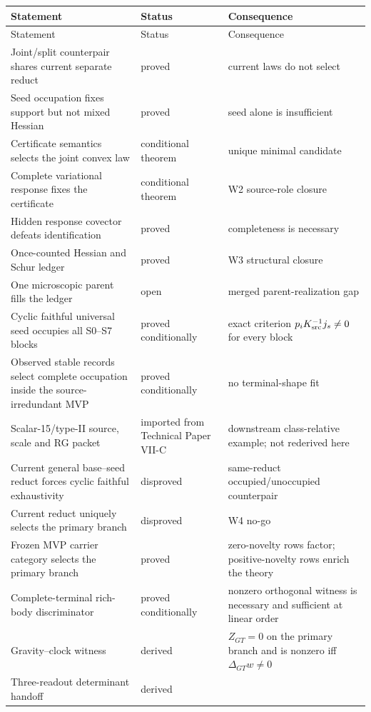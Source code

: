 \documentclass[11pt]{article}
\begin{document}
{\small
\begin{longtable}{p{.46\linewidth}p{.17\linewidth}p{.25\linewidth}}
\toprule
Statement & Status & Consequence\\
\midrule
\endfirsthead
\toprule
Statement & Status & Consequence\\
\midrule
\endhead
Joint/split counterpair shares current separate reduct & proved & current laws do not select\\
Seed occupation fixes support but not mixed Hessian & proved & seed alone is insufficient\\
Certificate semantics selects the joint convex law & conditional theorem & unique minimal candidate\\
Complete variational response fixes the certificate & conditional theorem & W2 source-role closure\\
Hidden response covector defeats identification & proved & completeness is necessary\\
Once-counted Hessian and Schur ledger & proved & W3 structural closure\\
One microscopic parent fills the ledger & open & merged parent-realization gap\\
Cyclic faithful universal seed occupies all S0--S7 blocks & proved
conditionally & exact criterion $p_iK_{\rm src}^{-1}j_s\ne0$ for every block\\
Observed stable records select complete occupation inside the
source-irredundant MVP & proved conditionally & no terminal-shape fit\\
Scalar-15/type-II source, scale and RG packet & imported from Technical Paper
VII-C & downstream class-relative example; not rederived here\\
Current general base--seed reduct forces cyclic faithful exhaustivity &
disproved & same-reduct occupied/unoccupied counterpair\\
Current reduct uniquely selects the primary branch & disproved & W4 no-go\\
Frozen MVP carrier category selects the primary branch & proved &
zero-novelty rows factor; positive-novelty rows enrich the theory\\
Complete-terminal rich-body discriminator & proved conditionally &
nonzero orthogonal witness is necessary and sufficient at linear order\\
Gravity--clock witness & derived &
\(Z_{GT}=0\) on the primary branch and is nonzero iff
\(\Delta_{GT}w\ne0\)\\
Three-readout determinant handoff & derived &

\end{longtable}}
\end{document}
